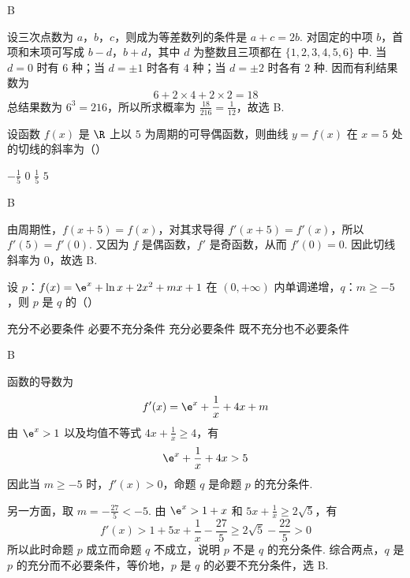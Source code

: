 \begin{answer}
B
\end{answer}

\begin{solution}
设三次点数为 \(a\)，\(b\)，\(c\)，则成为等差数列的条件是 \(a+c=2b\). 对固定的中项 \(b\)，首项和末项可写成 \(b-d\)，\(b+d\)，其中 \(d\) 为整数且三项都在 \(\{1,2,3,4,5,6\}\) 中. 当 \(d=0\) 时有 \(6\) 种；当 \(d=\pm1\) 时各有 \(4\) 种；当 \(d=\pm2\) 时各有 \(2\) 种. 因而有利结果数为
\[
6+2\times4+2\times2=18
\]
总结果数为 \(6^3=216\)，所以所求概率为 \(\frac{18}{216}=\frac{1}{12}\)，故选 B.
\end{solution}

\begin{problem}
设函数 \(f(x)\) 是 \(\R\) 上以 \(5\) 为周期的可导偶函数，则曲线 \(y=f(x)\) 在 \(x=5\) 处的切线的斜率为（\quad）

\choices
    {\(-\frac{1}{5}\)}
    {\(0\)}
    {\(\frac{1}{5}\)}
    {\(5\)}
\end{problem}

\begin{answer}
B
\end{answer}

\begin{solution}
由周期性，\(f(x+5)=f(x)\)，对其求导得 \(f'(x+5)=f'(x)\)，所以 \(f'(5)=f'(0)\). 又因为 \(f\) 是偶函数，\(f'\) 是奇函数，从而 \(f'(0)=0\). 因此切线斜率为 \(0\)，故选 B.
\end{solution}

\begin{problem}
设 \(p\)：\(f(x) = \e^{x} + \ln x + 2x^{2} + mx + 1\) 在 \((0, +\infty)\) 内单调递增，\(q\)：\(m \geqslant -5\)，则 \(p\) 是 \(q\) 的（\quad）

\choices
    {充分不必要条件}
    {必要不充分条件}
    {充分必要条件}
    {既不充分也不必要条件}
\end{problem}

\begin{answer}
B
\end{answer}

\begin{solution}
函数的导数为
\[
f'(x)=\e^x+\frac1x+4x+m
\]
由 \(\e^x>1\) 以及均值不等式 \(4x+\frac1x\geqslant4\)，有
\[
\e^x+\frac1x+4x>5
\]
因此当 \(m\geqslant-5\) 时，\(f'(x)>0\)，命题 \(q\) 是命题 \(p\) 的充分条件.

另一方面，取 \(m=-\frac{27}{5}<-5\). 由 \(\e^x>1+x\) 和 \(5x+\frac1x\geqslant2\sqrt5\)，有
\[
f'(x)>1+5x+\frac1x-\frac{27}{5}\geqslant2\sqrt5-\frac{22}{5}>0
\]
所以此时命题 \(p\) 成立而命题 \(q\) 不成立，说明 \(p\) 不是 \(q\) 的充分条件. 综合两点，\(q\) 是 \(p\) 的充分而不必要条件，等价地，\(p\) 是 \(q\) 的必要不充分条件，选 B.
\end{solution}

